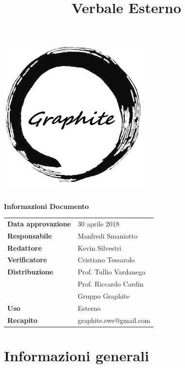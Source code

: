 \documentclass[openany,12pt,a4paper]{article}
\title{Verbale Esterno}
\author{}
\begin{document}
 
  \makeatletter 
  \begin{titlepage} 
    \setlength{\headsep}{0pt}   
    \begin{center} 
      \includegraphics[width=0.5\linewidth]{Logo.png}\\[1em] 
      {\huge \bfseries  \@title }\\[10ex] 
      \textbf{\Large Informazioni Documento} \\[2em] 
      \bgroup 
      \def\arraystretch{1.5} 
      \begin{tabular}{l|l} 
        \textbf{Data approvazione} & 30 aprile 2018 \\ 
        \textbf{Responsabile} & Manfredi Smaniotto \\ 
        \textbf{Redattore} & Kevin Silvestri \\ 
        \textbf{Verificatore} & Cristiano Tessarolo \\ 
        \textbf{Distribuzione} & Prof. Tullio Vardanega \\ 
         & Prof. Riccardo Cardin \\ 
         & Gruppo Graphite \\ 
        \textbf{Uso} & Esterno \\ 
        \textbf{Recapito} & graphite.swe@gmail.com \\ 
      \end{tabular} 
    \egroup 
    \end{center} 
  \end{titlepage} 
  \makeatother 
 
  \thispagestyle{empty} 
  \newpage 
   
  \tableofcontents 
  \newpage 
   
  \section{Informazioni generali} 
   
\end{document}
